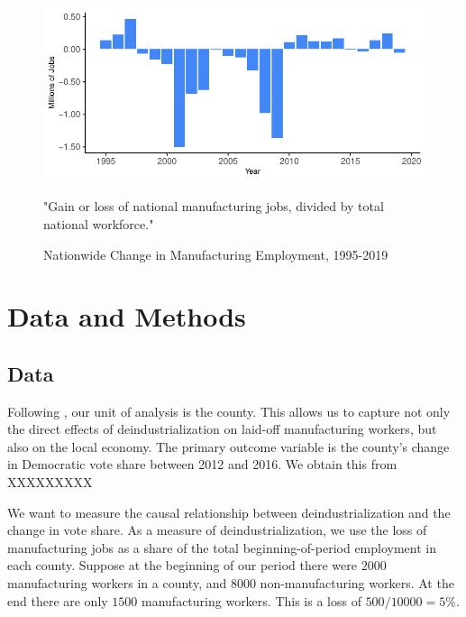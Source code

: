 \documentclass[]{AEA}
\begin{document}
\begin{figure} \label{natlPlot}
\caption{Nationwide Change in Manufacturing Employment, 1995-2019}

\begin{center}\includegraphics{Final-Draft_files/figure-latex/unnamed-chunk-3-1} \end{center}
\begin{figurenotes}
"Gain or loss of national manufacturing jobs, divided by total national workforce."
\end{figurenotes}
\end{figure}

\section{Data and Methods} 
\label{datamethods}

\subsection{Data} 
\label{datasec}

Following \cite{Baccini21}, our unit of analysis is the county. This
allows us to capture not only the direct effects of deindustrialization
on laid-off manufacturing workers, but also on the local economy. The
primary outcome variable is the county's change in Democratic vote share
between 2012 and 2016. We obtain this from XXXXXXXXX

We want to measure the causal relationship between deindustrialization
and the change in vote share. As a measure of deindustrialization, we
use the loss of manufacturing jobs as a share of the total
beginning-of-period employment in each county. Suppose at the beginning
of our period there were \(2000\) manufacturing workers in a county, and
\(8000\) non-manufacturing workers. At the end there are only \(1500\)
manufacturing workers. This is a loss of \(500/10000 = 5\%.\)
\end{document}
